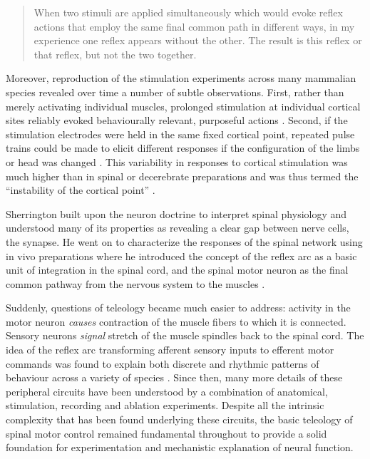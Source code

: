 \blockquote[{\protect\cite[p.461]{Sherrington1904}}]{When two stimuli are applied simultaneously which would evoke reflex actions that employ the same final common path in different ways, in my experience one reflex appears without the other. The result is this reflex or that reflex, but not the two together.}



Moreover, reproduction of the stimulation experiments across many mammalian species \cite{Ferrier1873,Clark1937} revealed over time a number of subtle observations. First, rather than merely activating individual muscles, prolonged stimulation at individual cortical sites reliably evoked behaviourally relevant, purposeful actions \cite{Ferrier1873,Clark1937}. Second, if the stimulation electrodes were held in the same fixed cortical point, repeated pulse trains could be made to elicit different responses if the configuration of the limbs or head was changed \cite{Ward1938}. This variability in responses to cortical stimulation was much higher than in spinal or decerebrate preparations and was thus termed the ``instability of the cortical point'' \cite{GrahamBrown1912,Leyton1917}.

Sherrington built upon the neuron doctrine to interpret spinal physiology and understood many of its properties as revealing a clear gap between nerve cells, the synapse. He went on to characterize the responses of the spinal network using in vivo preparations where he introduced the concept of the reflex arc as a basic unit of integration in the spinal cord, and the spinal motor neuron as the final common pathway from the nervous system to the muscles \cite{Sherrington1906}.

Suddenly, questions of teleology became much easier to address: activity in the motor neuron \emph{causes} contraction of the muscle fibers to which it is connected. Sensory neurons \emph{signal} stretch of the muscle spindles back to the spinal cord. The idea of the reflex arc transforming afferent sensory inputs to efferent motor commands was found to explain both discrete and rhythmic patterns of behaviour across a variety of species \cite{Sherrington1893b}. Since then, many more details of these peripheral circuits have been understood by a combination of anatomical, stimulation, recording and ablation experiments. Despite all the intrinsic complexity that has been found underlying these circuits, the basic teleology of spinal motor control remained fundamental throughout to provide a solid foundation for experimentation and mechanistic explanation of neural function.

